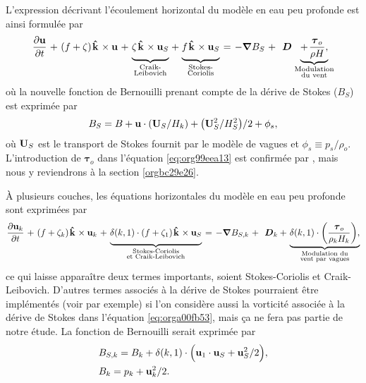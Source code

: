 \documentclass[10pt]{report}
\numberwithin{equation}{section}
\newcommand{\kvf}{\vb{\hat{k}}}
\newcommand{\uu}{\vb{u}}
\newcommand{\tall}{\vphantom{pA^{x^x}_p}}
\newcommand{\grande}{\vphantom{\frac{1}{xx}}}
\newcommand{\pt}{\hspace{1pt}} %
\begin{document}
L'expression décrivant l'écoulement horizontal du modèle en eau peu profonde est ainsi formulée par
\begin{equation}
\label{eq:org99eea13}
   \pdv{\uu}{t}
   \pt + \pt \qty(f+\zeta)\pt \kvf\pt \times \uu
   \pt + \pt \underbrace{\grande\zeta\pt \kvf\pt \times \uu_S}_{\substack{\text{Craik-}\\ \text{Leibovich}}}
   \pt + \pt \underbrace{\grande f\pt \kvf\pt \times \uu_S  }_{\substack{\text{Stokes-}\\ \text{Coriolis}}}
   \pt = \pt -\gradient{B_S}
   \pt + \pt \ \boldsymbol{D}
    \pt \underbrace{+\pt\frac{\boldsymbol{\tau}_o}{\rho H},}_{\substack{\text{Modulation}\\ \text{du vent}}}
\end{equation}
où la nouvelle fonction de Bernouilli prenant compte de la dérive de Stokes (\(B_S\)) est exprimée par
\begin{align}
   B_S = B + \uu\cdot\qty(\vb{U}_S/H_k) + \qty(\vb{U}_S^2/H_S^2)/2 + \phi_s,
\end{align}
où \(\vb{U}_S\) est le transport de Stokes fournit par le modèle de vagues et \(\phi_s\equiv p_s/\rho_o\).
L'introduction de \(\boldsymbol{\tau}_o\) dans l'équation \ref{eq:org99eea13} est confirmée par \Textcite{breivik_al_2015}, mais nous y reviendrons à la section \ref{orgbc29e26}.
\bigskip

À plusieurs couches, les équations horizontales du modèle en eau peu profonde sont exprimées par
\begin{equation}
\label{eq:orga00fb53}
   \pdv{\uu_k}{t}
   \pt + \pt \qty(f+\zeta_k)\pt \kvf\pt \times \uu_k
   \pt + \pt \underbrace{\delta(k,1)\cdot\grande\qty(f + \zeta_1)\pt \kvf\pt \times \uu_S}_{\substack{\text{Stokes-Coriolis}\\ \text{et Craik-Leibovich}}}
   \pt = \pt -\gradient{B_{S,k}}
   \pt + \pt \ \boldsymbol{D}_k
   +\pt \underbrace{\delta(k,1)\cdot\qty(\frac{\boldsymbol{\tau}_o}{\rho_k H_k}),}_{\substack{\text{Modulation du}\\ \text{vent par vagues}}}
\end{equation}
ce qui laisse apparaître deux termes importants, soient Stokes-Coriolis et Craik-Leibovich.
D'autres termes associés à la dérive de Stokes pourraient être implémentés (voir \Textcite{wu_breivik_2019} par exemple) si l'on considère aussi la vorticité associée à la dérive de Stokes dans l'équation \ref{eq:orga00fb53}, mais ça ne fera pas partie de notre étude.
La fonction de Bernouilli serait exprimée par
\begin{align}
   & B_{S,k} = B_k + \delta(k,1)\cdot\qty(\tall\uu_1\cdot\vb{u}_S + \vb{u}_S^2/2), \\
   & B_k = p_k + \vb{u}_k^2/2.
\end{align}
\end{document}
